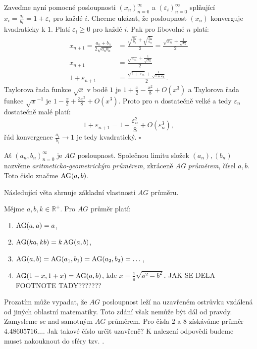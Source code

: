 \documentclass[12pt]{report}
\begin{document}
Zaveďme nyní pomocné posloupnosti $(x_n)_{n=0}^{\infty}$ a $(\varepsilon_i)_{n=0}^{\infty}$ splňující $x_i = \frac{a_i}{b_i} = 1 + \varepsilon_i$ pro každé $i$. Chceme ukázat, že posloupnost $(x_n)$ konverguje kvadraticky k $1$. Platí $\varepsilon_i \geqslant 0$ pro každé $i$. Pak pro libovolné $n$ platí:
\begin{align*}
x_{n+1} = \frac{a_n+b_n}{2 \sqrt{a_n b_n}} &= \frac{\sqrt{\frac{a_n}{b_n}} + \sqrt{\frac{b_n}{a_n}}}{2} = \frac{\sqrt{x_n}+\frac{1}{\sqrt{x_n}}}{2}\\
x_{n+1} &=\frac{\sqrt{x_n}+\frac{1}{\sqrt{x_n}}}{2}\\
1+\varepsilon_{n+1}  &= \frac{\sqrt{1+\varepsilon_n} + \frac{1}{\sqrt{1+\varepsilon_n}}}{2}.
\end{align*}
Taylorova řada funkce $\sqrt{x}$ v bodě $1$ je $1+\frac{x}{2} - \frac{x^2}{8} + O(x^3)$ a Taylorova řada funkce $\sqrt{x}^{-1}$ je $1-\frac{x}{2}+\frac{3 x^2}{8} + O(x^3)$. Proto pro $n$ dostatečně velké a tedy $\varepsilon_n$ dostatečně malé platí:
$$1+\varepsilon_{n+1}  = 1+\frac{\varepsilon_n ^2}{8} + O(\varepsilon_n ^3),$$ 
řád konvergence $\frac{a_i}{b_i} \rightarrow 1$ je tedy kvadratický. \hfill $\square$\\


\begin{definice}
Ať $(a_n,b_n)_{n=0}^{\infty}$ je $AG$ posloupnost. Společnou limitu složek $(a_n),(b_n)$ nazvěme \textit{aritmeticko-geometrickým průměrem}, zkráceně \textit{AG průměrem}, čísel $a,b$. Toto číslo značme $\operatorname{AG}(a,b)$.
\end{definice}


Následující věta shrnuje základní vlastnosti $AG$ průměru. 

\begin{veta}\label{zkjb}
Mějme $a,b,k \in \mathbb{R}^{+}$. Pro $AG$ průměr platí:
\begin{enumerate}
\item $\operatorname{AG}(a,a) = a$,
\item $\operatorname{AG}(ka,kb) = k \operatorname{AG} (a,b)$,
\item $\operatorname{AG}(a,b) = \operatorname{AG}(a_1,b_1) = \operatorname{AG}(a_2,b_2) = \dots$,
\item $\operatorname{AG}(1-x,1+x) = \operatorname{AG}(a,b)$, kde $x = \frac{1}{a} \sqrt{a^2 - b^2}$. JAK SE DELA FOOTNOTE TADY???????
\end{enumerate}
\end{veta}



Prozatím může vypadat, že $AG$ posloupnost leží na uzavřeném ostrůvku vzdálená od jiných oblastní matematiky. Toto zdání však nemůže být dál od pravdy. Zamysleme se nad samotným $AG$ průměrem. Pro čísla $2$ a $8$ získáváme průměr $4.48605716\dots$. Jak takové číslo určit uzavřeně? K nalezení odpovědi budeme muset nakouknout do sféry tzv. .
\end{document}
